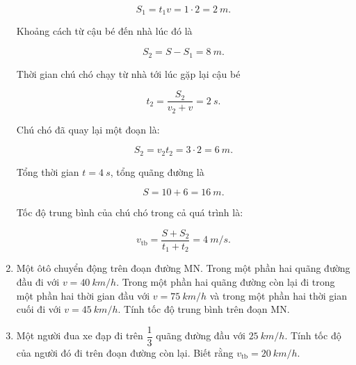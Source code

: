 \begin{enumerate}[label=\bfseries Bài \arabic*:]
{		$$S_1 = t_1 v = 1 \cdot 2 = \SI{2}{m}.$$
		
		Khoảng cách từ cậu bé đến nhà lúc đó là
		
		$$S_2 = S - S_1 = \SI{8}{m}.$$
		
		Thời gian chú chó chạy từ nhà tới lúc gặp lại cậu bé
		
		$$t_2 = \dfrac{S_2}{v_2 + v} = \SI{2}{s}.$$
		
		Chú chó đã quay lại một đoạn là:
		
		$$S_2 = v_2t_2 = 3 \cdot 2 = \SI{6}{m}.$$
		
		Tổng thời gian $t = \SI{4}{s}$, tổng quãng đường là 
		
		$$S = 10 + 6 = \SI{16}{m}.$$
		
		Tốc độ trung bình của chú chó trong cả quá trình là: 
		
		$$v_\text{tb} = \dfrac{S + S_2}{t_1 + t_2} = \SI{4}{m/s}.$$
	}
	\item {}
	
	{
		Một ôtô chuyển động trên đoạn đường MN. Trong một phần hai quãng đường đầu đi với $v = \SI{40}{km/h}$. Trong một phần hai quãng đường còn lại đi trong một phần hai thời gian đầu với $v = \SI{75}{km/h}$ và trong một phần hai thời gian cuối đi với $v = \SI{45}{km/h}$. Tính tốc độ trung bình trên đoạn MN.
	}
	\item {}
	
	{
		
		Một người đua xe đạp đi trên $\dfrac{1}{3}$ quãng đường đầu với $\SI{25}{km/h}$. Tính tốc độ của người đó đi trên đoạn đường còn lại. Biết rằng $v_\text{tb} = \SI{20}{km/h}$.
	}
\end{enumerate}

